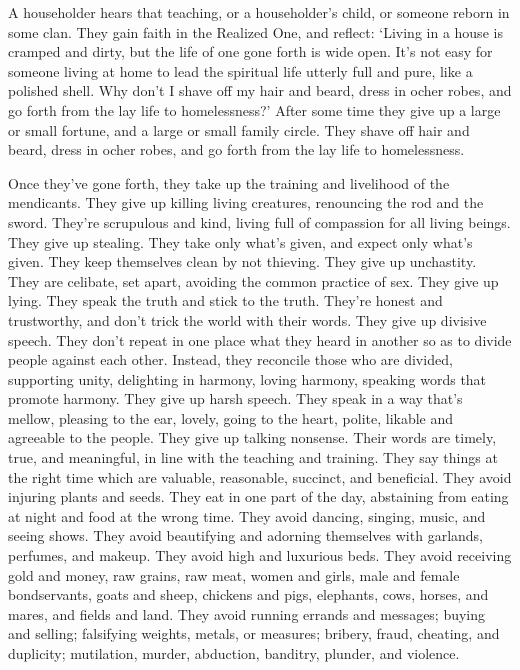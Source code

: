 \documentclass[12pt,openany]{book}%
\begin{document}
A householder hears that teaching, or a householder’s child, or someone reborn in some clan. They gain faith in the Realized One, and reflect: ‘Living in a house is cramped and dirty, but the life of one gone forth is wide open. It’s not easy for someone living at home to lead the spiritual life utterly full and pure, like a polished shell. Why don’t I shave off my hair and beard, dress in ocher robes, and go forth from the lay life to homelessness?’ After some time they give up a large or small fortune, and a large or small family circle. They shave off hair and beard, dress in ocher robes, and go forth from the lay life to homelessness. 

Once they’ve gone forth, they take up the training and livelihood of the mendicants. They give up killing living creatures, renouncing the rod and the sword. They’re scrupulous and kind, living full of compassion for all living beings. They give up stealing. They take only what’s given, and expect only what’s given. They keep themselves clean by not thieving. They give up unchastity. They are celibate, set apart, avoiding the common practice of sex. They give up lying. They speak the truth and stick to the truth. They’re honest and trustworthy, and don’t trick the world with their words. They give up divisive speech. They don’t repeat in one place what they heard in another so as to divide people against each other. Instead, they reconcile those who are divided, supporting unity, delighting in harmony, loving harmony, speaking words that promote harmony. They give up harsh speech. They speak in a way that’s mellow, pleasing to the ear, lovely, going to the heart, polite, likable and agreeable to the people. They give up talking nonsense. Their words are timely, true, and meaningful, in line with the teaching and training. They say things at the right time which are valuable, reasonable, succinct, and beneficial. They avoid injuring plants and seeds. They eat in one part of the day, abstaining from eating at night and food at the wrong time. They avoid dancing, singing, music, and seeing shows. They avoid beautifying and adorning themselves with garlands, perfumes, and makeup. They avoid high and luxurious beds. They avoid receiving gold and money, raw grains, raw meat, women and girls, male and female bondservants, goats and sheep, chickens and pigs, elephants, cows, horses, and mares, and fields and land. They avoid running errands and messages; buying and selling; falsifying weights, metals, or measures; bribery, fraud, cheating, and duplicity; mutilation, murder, abduction, banditry, plunder, and violence. 
\end{document}
